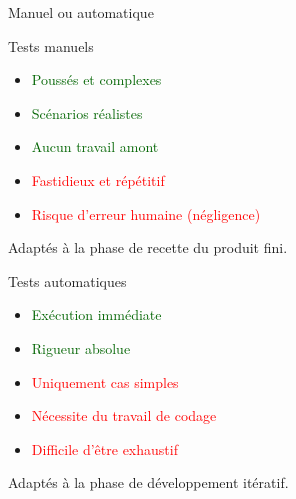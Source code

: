\documentclass[a4paper]{beamer}
\begin{document}
{\begin{frame}{Manuel ou automatique}
\begin{block}{Tests manuels}
		\begin{minipage}{0.44\textwidth}
			\begin{itemize}
				\item \textcolor{darkgreen}{Poussés et complexes}
				\item \textcolor{darkgreen}{Scénarios réalistes}
				\item \textcolor{darkgreen}{Aucun travail amont}
			\end{itemize}
		\end{minipage}\hfill
		\begin{minipage}{0.55\textwidth}
			\begin{itemize}
				\item \textcolor{red}{Fastidieux et répétitif}
				\item \textcolor{red}{Risque d'erreur humaine (négligence)}
			\end{itemize}
		\end{minipage}
		\vspace{0.2cm}
		\begin{center}
			Adaptés à la phase de recette du produit fini.
		\end{center}
		
	\end{block}
	
	\begin{block}{Tests automatiques}
		\begin{minipage}{0.44\textwidth}
			\begin{itemize}
				\item \textcolor{darkgreen}{Exécution immédiate}
				\item \textcolor{darkgreen}{Rigueur absolue}
			\end{itemize}
		\end{minipage}\hfill
		\begin{minipage}{0.55\textwidth}
			\begin{itemize}
				\item \textcolor{red}{Uniquement cas simples}
				\item \textcolor{red}{Nécessite du travail de codage}
				\item \textcolor{red}{Difficile d'être exhaustif}
			\end{itemize}
		\end{minipage}
		
		\vspace{0.2cm}
		\begin{center}
			Adaptés à la phase de développement itératif.
		\end{center}
		

\end{block}
\end{frame}}
\end{document}
